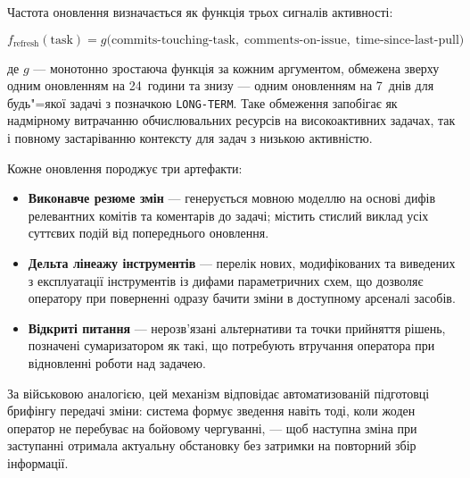 
Частота оновлення визначається як функція трьох сигналів активності:

\begin{equation}
  f_{\text{refresh}}(\text{task}) = g\bigl(
    \text{commits-touching-task},\;
    \text{comments-on-issue},\;
    \text{time-since-last-pull}
  \bigr)
  \label{eq:refresh}
\end{equation}

\noindent де $g$ --- монотонно зростаюча функція за кожним аргументом, обмежена зверху одним оновленням на 24~години та знизу --- одним оновленням на 7~днів для будь"=якої задачі з позначкою \texttt{LONG-TERM}.
Таке обмеження запобігає як надмірному витрачанню обчислювальних ресурсів на високоактивних задачах, так і повному застаріванню контексту для задач з низькою активністю.

Кожне оновлення породжує три артефакти:

\begin{itemize}[nosep]
  \item \textbf{Виконавче резюме змін} --- генерується мовною моделлю на основі дифів релевантних комітів та коментарів до задачі; містить стислий виклад усіх суттєвих подій від попереднього оновлення.
  \item \textbf{Дельта лінеажу інструментів} --- перелік нових, модифікованих та виведених з експлуатації інструментів із дифами параметричних схем, що дозволяє оператору при поверненні одразу бачити зміни в доступному арсеналі засобів.
  \item \textbf{Відкриті питання} --- нерозв'язані альтернативи та точки прийняття рішень, позначені сумаризатором як такі, що потребують втручання оператора при відновленні роботи над задачею.
\end{itemize}

За військовою аналогією, цей механізм відповідає автоматизованій підготовці брифінгу передачі зміни: система формує зведення навіть тоді, коли жоден оператор не перебуває на бойовому чергуванні, --- щоб наступна зміна при заступанні отримала актуальну обстановку без затримки на повторний збір інформації.
